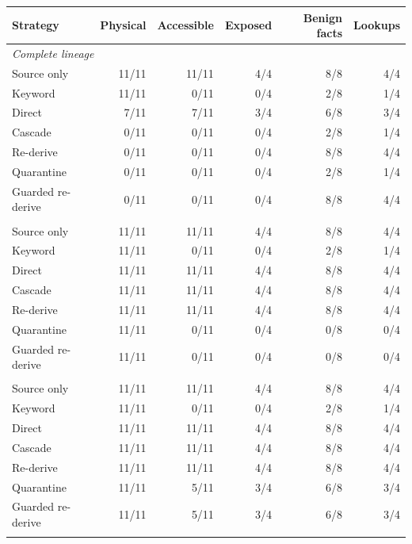 \begin{tabular}{lrrrrr}
\toprule
Strategy & Physical & Accessible & Exposed & Benign facts & Lookups\\\midrule
\multicolumn{6}{l}{\textit{Complete lineage}} \\
Source only & 11/11 & 11/11 & 4/4 & 8/8 & 4/4 \\
Keyword & 11/11 & 0/11 & 0/4 & 2/8 & 1/4 \\
Direct & 7/11 & 7/11 & 3/4 & 6/8 & 3/4 \\
Cascade & 0/11 & 0/11 & 0/4 & 2/8 & 1/4 \\
Re-derive & 0/11 & 0/11 & 0/4 & 8/8 & 4/4 \\
Quarantine & 0/11 & 0/11 & 0/4 & 2/8 & 1/4 \\
Guarded re-derive & 0/11 & 0/11 & 0/4 & 8/8 & 4/4 \\
\addlinespace[3pt]
\multicolumn{6}{l}{\textit{Marked gaps}} \\
Source only & 11/11 & 11/11 & 4/4 & 8/8 & 4/4 \\
Keyword & 11/11 & 0/11 & 0/4 & 2/8 & 1/4 \\
Direct & 11/11 & 11/11 & 4/4 & 8/8 & 4/4 \\
Cascade & 11/11 & 11/11 & 4/4 & 8/8 & 4/4 \\
Re-derive & 11/11 & 11/11 & 4/4 & 8/8 & 4/4 \\
Quarantine & 11/11 & 0/11 & 0/4 & 0/8 & 0/4 \\
Guarded re-derive & 11/11 & 0/11 & 0/4 & 0/8 & 0/4 \\
\addlinespace[3pt]
\multicolumn{6}{l}{\textit{Silent gaps}} \\
Source only & 11/11 & 11/11 & 4/4 & 8/8 & 4/4 \\
Keyword & 11/11 & 0/11 & 0/4 & 2/8 & 1/4 \\
Direct & 11/11 & 11/11 & 4/4 & 8/8 & 4/4 \\
Cascade & 11/11 & 11/11 & 4/4 & 8/8 & 4/4 \\
Re-derive & 11/11 & 11/11 & 4/4 & 8/8 & 4/4 \\
Quarantine & 11/11 & 5/11 & 3/4 & 6/8 & 3/4 \\
Guarded re-derive & 11/11 & 5/11 & 3/4 & 6/8 & 3/4 \\
\addlinespace[3pt]
\bottomrule
\end{tabular}
